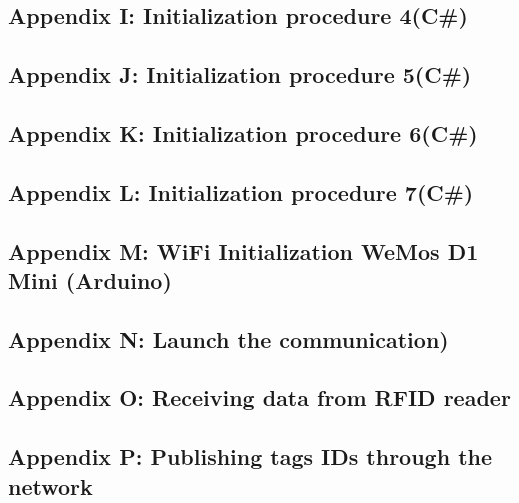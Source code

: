 \subsection{Appendix I: Initialization procedure 4(C\#)}\label{Sec_AppI}
\scriptsize


\subsection{Appendix J: Initialization procedure 5(C\#)}\label{Sec_AppJ}
\scriptsize


\subsection{Appendix K: Initialization procedure 6(C\#)}\label{Sec_AppK}
\scriptsize


\subsection{Appendix L: Initialization procedure 7(C\#)}\label{Sec_AppL}
\scriptsize

\pagebreak

\subsection{Appendix M: WiFi Initialization WeMos D1 Mini (Arduino)}\label{Sec_AppM}
\scriptsize


\subsection{Appendix N: Launch the communication)}\label{Sec_AppM}
\scriptsize


\subsection{Appendix O: Receiving data from RFID reader}\label{Sec_AppM}
\scriptsize


\subsection{Appendix P: Publishing tags IDs through the network}\label{Sec_AppM}
\scriptsize


